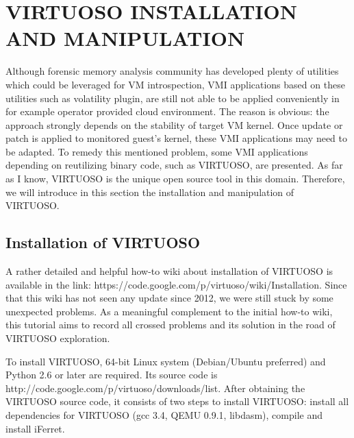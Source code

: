 
\chapter{VIRTUOSO INSTALLATION AND MANIPULATION} %

\label{Chapter8} %



Although forensic memory analysis community has developed plenty of utilities which could be leveraged for VM introspection, 
VMI applications based on these utilities such as volatility plugin, are still not able to be applied conveniently in for example 
operator provided cloud environment. The reason is obvious: the approach strongly depends on the stability of target VM kernel. 
Once update or patch is applied to monitored guest’s kernel, these VMI applications may need to be adapted. 
To remedy this mentioned problem, some VMI applications depending on reutilizing binary code, such as VIRTUOSO, are presented. 
As far as I know, VIRTUOSO is the unique open source tool in this domain. Therefore, we will introduce in this section the installation 
and manipulation of VIRTUOSO.



\section{Installation of VIRTUOSO}

A rather detailed and helpful how-to wiki about installation of VIRTUOSO is available in the link: 
https://code.google.com/p/virtuoso/wiki/Installation. Since that this wiki has not seen any update since 2012, 
we were still stuck by some unexpected problems.  As a meaningful complement to the initial how-to wiki, this tutorial aims to record 
all crossed problems and its solution in the road of VIRTUOSO exploration.

To install VIRTUOSO, 64-bit Linux system (Debian/Ubuntu preferred) and Python 2.6 or later are required. Its source code is 
http://code.google.com/p/virtuoso/downloads/list. After obtaining the VIRTUOSO source code, it consists of two steps to install VIRTUOSO:
install all dependencies for VIRTUOSO (gcc 3.4, QEMU 0.9.1, libdasm), compile and install iFerret.

